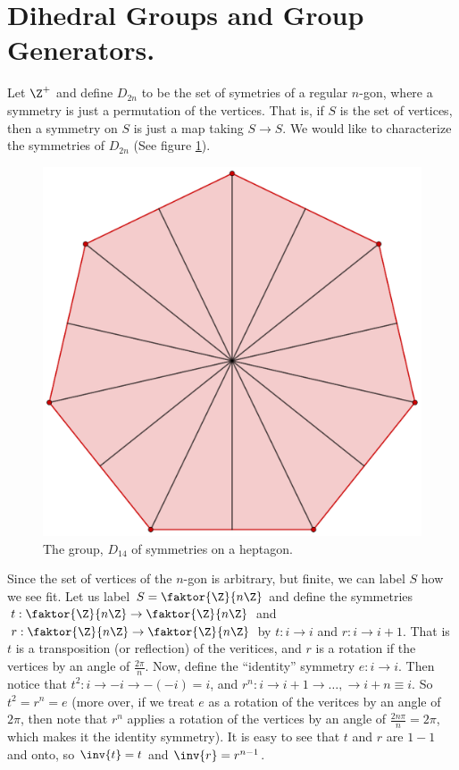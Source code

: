 
\section{Dihedral Groups and Group Generators.}
\label{section1}

Let $\Z^+$ and define $D_{2n}$ to be the set of symetries of a regular $n$-gon,
where a symmetry is just a permutation of the vertices. That is, if  $S$ is the
set of vertices, then a symmetry on  $S$ is just a map taking $S \rightarrow S$.
We would like to characterize the symmetries of $D_{2n}$ (See figure
\ref{fig_1.1}).

\begin{figure}
    \centering
    \includegraphics[scale=0.2]{Figures/Chapter1/D_14_symm.eps}
    \caption{The group, $D_{14}$ of symmetries on a heptagon.}
    \label{fig_1.1}
\end{figure}

Since the set of vertices of the $n$-gon is arbitrary, but finite, we can label
$S$ how we see fit. Let us label  $S = \faktor{\Z}{n\Z}$ and define the
symmetries $t:\faktor{\Z}{n\Z} \rightarrow \faktor{\Z}{n\Z}$ and $r:\faktor{\Z}{n\Z}
\rightarrow \faktor{\Z}{n\Z}$ by $t:i \rightarrow i$ and $r:i \rightarrow i+1$.
That is $t$ is a transposition  (or reflection) of the veritices, and $r$ is a rotation
if the vertices by an angle of  $\frac{2\pi}{n}$. Now, define the ``identity''
symmetry $e:i \rightarrow i$. Then notice that $t^2:i \rightarrow -i \rightarrow
-(-i)=i$, and $r^n:i \rightarrow i+1 \rightarrow \dots, \rightarrow i+n \equiv
i$. So $t^2=r^n=e$  (more over, if we treat $e$ as a rotation of the veritces by
an angle of  $2\pi$, then note that $r^n$ applies a rotation of the vertices by
an angle of  $\frac{2n\pi}{n}=2\pi$, which makes it the identity symmetry). It
is easy to see that $t$ and  $r$ are  $1-1$ and onto, so  $\inv{t}=t$ and
$\inv{r}=r^{n-1}$.

